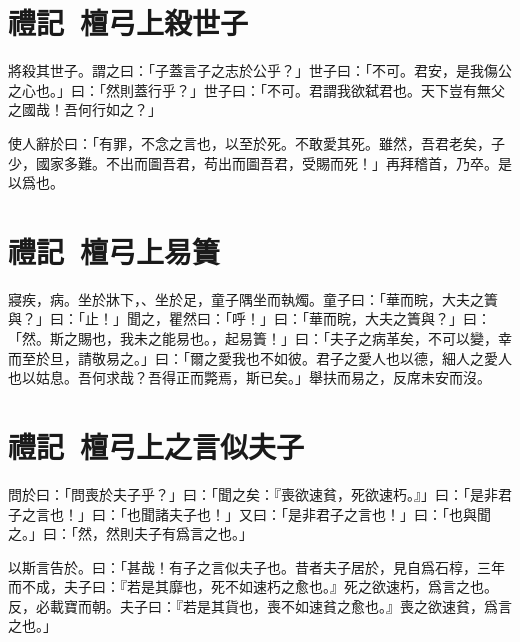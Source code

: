 \theendnotes

\section[晉獻公殺世子申生\quad{\small 禮記 檀弓上}]{{\normalsize 禮記\ 檀弓上}\quad {}殺世子}
將殺其世子。謂之曰：「子蓋言子之志於公乎？」世子曰：「不可。君安，是我傷公之心也。」曰：「然則蓋行乎？」世子曰：「不可。君謂我欲弑君也。天下豈有無父之國哉！吾何行如之？」

使人辭於曰：「有罪，不念之言也，以至於死。不敢愛其死。雖然，吾君老矣，子少，國家多難。不出而圖吾君，苟出而圖吾君，受賜而死！」再拜稽首，乃卒。是以爲也。

\section[曾子易簀\quad{\small 禮記 檀弓上}]{{\normalsize 禮記\ 檀弓上}\quad {}易簀}
寢疾，病。坐於牀下，、坐於足，童子隅坐而執燭。童子曰：「華而睆，大夫之簀與？」曰：「止！」聞之，瞿然曰：「呼！」曰：「華而睆，大夫之簀與？」曰：「然。斯之賜也，我未之能易也。，起易簀！」曰：「夫子之病革矣，不可以變，幸而至於旦，請敬易之。」曰：「爾之愛我也不如彼。君子之愛人也以德，細人之愛人也以姑息。吾何求哉？吾得正而斃焉，斯已矣。」舉扶而易之，反席未安而沒。

\section[有子之言似夫子\quad{\small 禮記 檀弓上}]{{\normalsize 禮記\ 檀弓上}\quad {}之言似夫子}
問於曰：「問喪於夫子乎？」曰：「聞之矣：『喪欲速貧，死欲速朽。』」曰：「是非君子之言也！」曰：「也聞諸夫子也！」又曰：「是非君子之言也！」曰：「也與聞之。」曰：「然，然則夫子有爲言之也。」

以斯言告於。曰：「甚哉！有子之言似夫子也。昔者夫子居於，見自爲石椁，三年而不成，夫子曰：『若是其靡也，死不如速朽之愈也。』死之欲速朽，爲言之也。反，必載寶而朝。夫子曰：『若是其貨也，喪不如速貧之愈也。』喪之欲速貧，爲言之也。」

